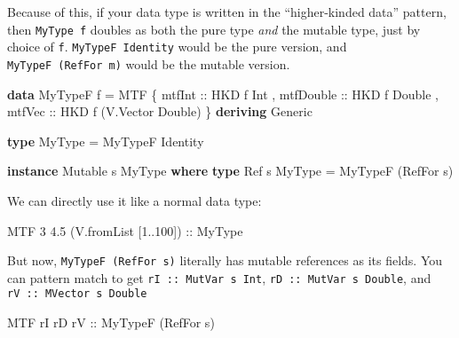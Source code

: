 \documentclass[]{article}
\newenvironment{Shaded}{}{}
\newcommand{\DataTypeTok}[1]{\textcolor[rgb]{0.56,0.13,0.00}{#1}}
\newcommand{\DecValTok}[1]{\textcolor[rgb]{0.25,0.63,0.44}{#1}}
\newcommand{\FloatTok}[1]{\textcolor[rgb]{0.25,0.63,0.44}{#1}}
\newcommand{\KeywordTok}[1]{\textcolor[rgb]{0.00,0.44,0.13}{\textbf{#1}}}
\newcommand{\NormalTok}[1]{#1}
\newcommand{\OperatorTok}[1]{\textcolor[rgb]{0.40,0.40,0.40}{#1}}
\newcommand{\OtherTok}[1]{\textcolor[rgb]{0.00,0.44,0.13}{#1}}
\begin{document}
Because of this, if your data type is written in the ``higher-kinded data''
pattern, then \texttt{MyType\ f} doubles as both the pure type \emph{and} the
mutable type, just by choice of \texttt{f}. \texttt{MyTypeF\ Identity} would be
the pure version, and \texttt{MyTypeF\ (RefFor\ m)} would be the mutable
version.

\begin{Shaded}
\begin{Highlighting}[]
\KeywordTok{data} \DataTypeTok{MyTypeF}\NormalTok{ f }\OtherTok{=} \DataTypeTok{MTF}
\NormalTok{    \{}\OtherTok{ mtfInt    ::} \DataTypeTok{HKD}\NormalTok{ f }\DataTypeTok{Int}
\NormalTok{    ,}\OtherTok{ mtfDouble ::} \DataTypeTok{HKD}\NormalTok{ f }\DataTypeTok{Double}
\NormalTok{    ,}\OtherTok{ mtfVec    ::} \DataTypeTok{HKD}\NormalTok{ f (}\DataTypeTok{V.Vector} \DataTypeTok{Double}\NormalTok{)}
\NormalTok{    \}}
  \KeywordTok{deriving} \DataTypeTok{Generic}

\KeywordTok{type} \DataTypeTok{MyType\textquotesingle{}} \OtherTok{=} \DataTypeTok{MyTypeF} \DataTypeTok{Identity}

\KeywordTok{instance} \DataTypeTok{Mutable}\NormalTok{ s }\DataTypeTok{MyType\textquotesingle{}} \KeywordTok{where}
    \KeywordTok{type} \DataTypeTok{Ref}\NormalTok{ s }\DataTypeTok{MyType\textquotesingle{}} \OtherTok{=} \DataTypeTok{MyTypeF}\NormalTok{ (}\DataTypeTok{RefFor}\NormalTok{ s)}
\end{Highlighting}
\end{Shaded}

We can directly use it like a normal data type:

\begin{Shaded}
\begin{Highlighting}[]
\DataTypeTok{MTF} \DecValTok{3} \FloatTok{4.5}\NormalTok{ (V.fromList [}\DecValTok{1}\OperatorTok{..}\DecValTok{100}\NormalTok{])}
\OtherTok{    ::} \DataTypeTok{MyType\textquotesingle{}}
\end{Highlighting}
\end{Shaded}

But now, \texttt{MyTypeF\ (RefFor\ s)} literally has mutable references as its
fields. You can pattern match to get \texttt{rI\ ::\ MutVar\ s\ Int},
\texttt{rD\ ::\ MutVar\ s\ Double}, and \texttt{rV\ ::\ MVector\ s\ Double}

\begin{Shaded}
\begin{Highlighting}[]
\DataTypeTok{MTF}\NormalTok{ rI rD}\OtherTok{ rV ::} \DataTypeTok{MyTypeF}\NormalTok{ (}\DataTypeTok{RefFor}\NormalTok{ s)}
\end{Highlighting}
\end{Shaded}
\end{document}
